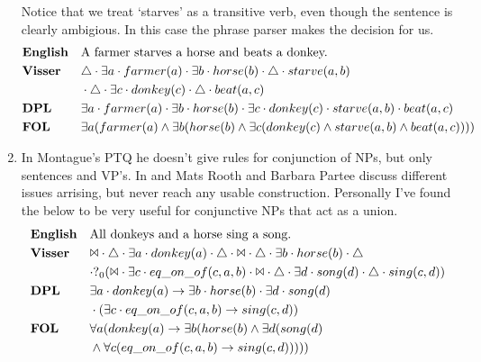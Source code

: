 \documentclass[12pt]{article}
\begin{document}
\begin{enumerate}
Notice that we treat `starves' as a transitive verb, even though the sentence is clearly ambigious. In this case the phrase parser makes the decision for us.
\begin{align*}
&\text{\textbf{English}}&&\text{A farmer starves a horse and beats a donkey.} \\
&\text{\textbf{Visser}}&&\triangle \cdot \exists a \cdot farmer(a) \cdot  \exists b \cdot horse(b) \cdot \triangle \cdot starve(a,b)\\&&&\cdot \triangle \cdot \exists c \cdot donkey(c) \cdot \triangle \cdot beat(a,c) \\
&\text{\textbf{DPL}}&&\exists a \cdot farmer(a) \cdot \exists b \cdot horse(b) \cdot \exists c \cdot donkey(c) \cdot starve(a,b) \cdot beat(a,c) \\
&\text{\textbf{FOL}}&&\exists a(farmer(a) \wedge \exists b(horse(b) \wedge \exists c(donkey(c) \wedge starve(a,b) \wedge beat(a,c)))) \\
\end{align*}
\item
In Montague's PTQ\cite{montague1973proper} he doesn't give rules for conjunction of NPs, but only sentences and VP's. In \cite{rooth1982conjunction} and \cite{partee1983generalized} Mats Rooth and Barbara Partee discuss different issues arrising, but never reach any usable construction. Personally I've found the below to be very useful for conjunctive NPs that act as a union.
\begin{align*}
&\text{\textbf{English}}&&\text{All donkeys and a horse sing a song.} \\
&\text{\textbf{Visser}}&&\Bowtie \cdot \triangle \cdot \exists a \cdot donkey(a) \cdot \triangle \cdot \Bowtie \cdot \triangle \cdot \exists b \cdot horse(b) \cdot \triangle\\&&& \cdot ?_0(\Bowtie \cdot \exists c \cdot eq\_on\_of(c,a,b) \cdot \Bowtie \cdot \triangle \cdot \exists d \cdot song(d) \cdot \triangle \cdot sing(c,d)) \\
&\text{\textbf{DPL}}&&\exists a \cdot donkey(a) \rightarrow \exists b \cdot horse(b) \cdot \exists d \cdot song(d)\\&&& \cdot (\exists c \cdot eq\_on\_of(c,a,b) \rightarrow sing(c,d)) \\
&\text{\textbf{FOL}}&&\forall a(donkey(a) \rightarrow \exists b(horse(b) \wedge \exists d(song(d)\\&&& \wedge \forall c(eq\_on\_of(c,a,b) \rightarrow sing(c,d))))) \\
\end{align*}

\end{enumerate}
\end{document}
